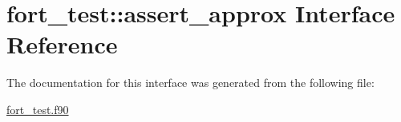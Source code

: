 \hypertarget{interfacefort__test_1_1assert__approx}{}\section{fort\+\_\+test\+:\+:assert\+\_\+approx Interface Reference}
\label{interfacefort__test_1_1assert__approx}


The documentation for this interface was generated from the following file\+:\begin{DoxyCompactItemize}
\item 
\hyperlink{fort__test_8f90}{fort\+\_\+test.\+f90}\end{DoxyCompactItemize}
